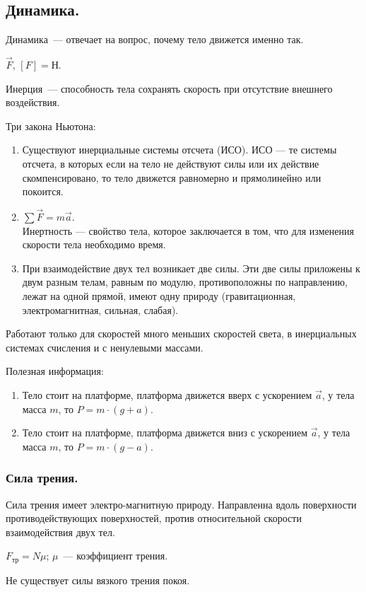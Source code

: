 \documentclass[12pt]{article}
\begin{document}
	\subsection{Динамика.}
	\begin{definition}
		Динамика~--- отвечает на вопрос, почему тело движется именно так.
	\end{definition}
	\noindent
	$\vec{F}$, $[F] = \text{Н}$.
	\begin{definition}
		Инерция~--- способность тела сохранять скорость при отсутствие внешнего воздействия.
	\end{definition}
	\begin{definition}
		Три закона Ньютона:
		\begin{enumerate}[1.]
			\item Существуют инерциальные системы отсчета (ИСО). ИСО --- те системы отсчета, в которых если на тело не действуют силы или их действие скомпенсировано, то тело движется равномерно и прямолинейно или покоится.
			\item $\sum\vec{F} = m\vec{a}$. \\
			Инертность --- свойство тела, которое заключается в том, что для изменения скорости тела необходимо время.
			\item При взаимодействие двух тел возникает две силы. Эти две силы приложены к двум разным телам, равным по модулю, противоположны по направлению, лежат на одной прямой, имеют одну природу (гравитационная, электромагнитная, сильная, слабая).
		\end{enumerate}
	\end{definition}
	\begin{statement}
		Работают только для скоростей много меньших скоростей света, в инерциальных системах счисления и с ненулевыми массами.
	\end{statement}
	\begin{statement}
		Полезная информация:
		\begin{enumerate}
			\item Тело стоит на платформе, платформа движется вверх с ускорением $\vec{a}$, у тела масса $m$, то $P = m \cdot (g + a)$.
			\item Тело стоит на платформе, платформа движется вниз с ускорением $\vec{a}$, у тела масса $m$, то $P = m \cdot (g - a)$.
		\end{enumerate}
	\end{statement}
	\subsubsection{Сила трения.}
	\begin{definition}
		Сила трения имеет электро-магнитную природу. Направленна вдоль поверхности противодействующих поверхностей, против относительной скорости взаимодействия двух тел.
	\end{definition}
	\begin{definition}
		$F_{\text{тр}} = N\mu$; $\mu$~--- коэффициент трения.
	\end{definition}
	\begin{statement}
		Не существует силы вязкого трения покоя.
	\end{statement}
\end{document}
